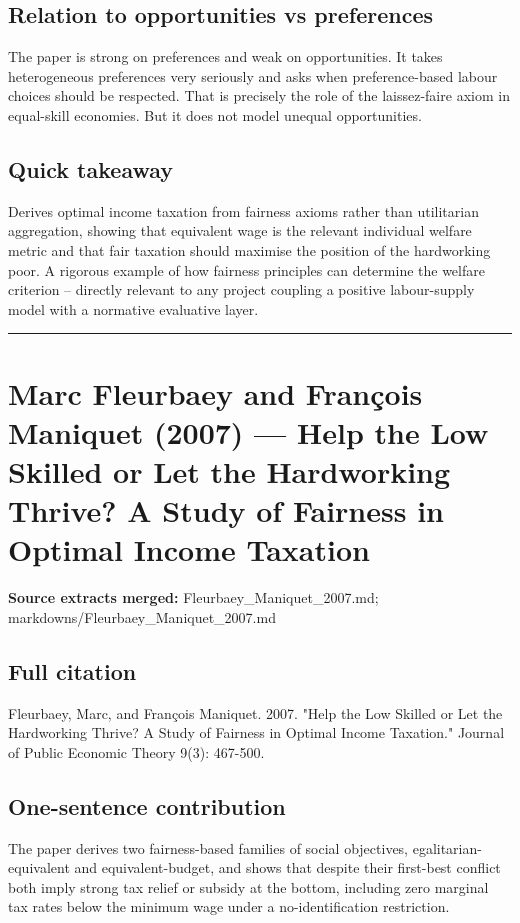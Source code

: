 \documentclass[11pt,a4paper]{article}
\begin{document}
\subsection*{Relation to opportunities vs preferences}
The paper is strong on preferences and weak on opportunities. It takes heterogeneous preferences very seriously and asks when preference-based labour choices should be respected. That is precisely the role of the laissez-faire axiom in equal-skill economies. But it does not model unequal opportunities.

\subsection*{Quick takeaway}
Derives optimal income taxation from fairness axioms rather than utilitarian aggregation, showing that equivalent wage is the relevant individual welfare metric and that fair taxation should maximise the position of the hardworking poor. A rigorous example of how fairness principles can determine the welfare criterion -- directly relevant to any project coupling a positive labour-supply model with a normative evaluative layer.


\medskip\hrule\medskip

\section*{Marc Fleurbaey and François Maniquet (2007) — Help the Low Skilled or Let the Hardworking Thrive? A Study of Fairness in Optimal Income Taxation}

\textbf{Source extracts merged:} Fleurbaey\_Maniquet\_2007.md; markdowns/Fleurbaey\_Maniquet\_2007.md

\subsection*{Full citation}
Fleurbaey, Marc, and François Maniquet. 2007. "Help the Low Skilled or Let the Hardworking Thrive? A Study of Fairness in Optimal Income Taxation." Journal of Public Economic Theory 9(3): 467-500.

\subsection*{One-sentence contribution}
The paper derives two fairness-based families of social objectives, egalitarian-equivalent and equivalent-budget, and shows that despite their first-best conflict both imply strong tax relief or subsidy at the bottom, including zero marginal tax rates below the minimum wage under a no-identification restriction.
\end{document}
